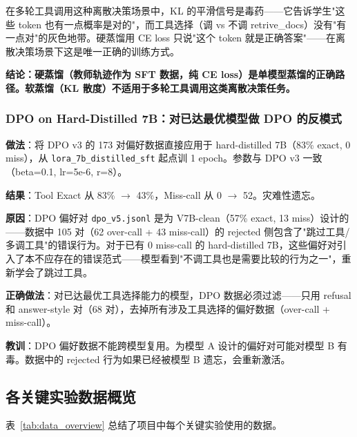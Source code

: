 \documentclass[12pt,a4paper]{ctexart}
\begin{document}
在多轮工具调用这种离散决策场景中，KL 的平滑信号是毒药——它告诉学生"这些 token 也有一点概率是对的"，而工具选择（调 vs 不调 retrive\_docs）没有"有一点对"的灰色地带。硬蒸馏用 CE loss 只说"这个 token 就是正确答案"——在离散决策场景下这是唯一正确的训练方式。

\textbf{结论：硬蒸馏（教师轨迹作为 SFT 数据，纯 CE loss）是单模型蒸馏的正确路径。软蒸馏（KL 散度）不适用于多轮工具调用这类离散决策任务。}

\subsubsection{DPO on Hard-Distilled 7B：对已达最优模型做 DPO 的反模式}

\textbf{做法}：将 DPO v3 的 173 对偏好数据直接应用于 hard-distilled 7B（83\% exact, 0 miss），从 \texttt{lora\_7b\_distilled\_sft} 起点训 1 epoch。参数与 DPO v3 一致（beta=0.1, lr=5e-6, r=8）。

\textbf{结果}：Tool Exact 从 83\% $\rightarrow$ 43\%，Miss-call 从 0 $\rightarrow$ 52。灾难性遗忘。

\textbf{原因}：DPO 偏好对 \texttt{dpo\_v5.jsonl} 是为 V7B-clean（57\% exact, 13 miss）设计的——数据中 105 对（62 over-call + 43 miss-call）的 rejected 侧包含了"跳过工具/多调工具"的错误行为。对于已有 0 miss-call 的 hard-distilled 7B，这些偏好对引入了本不应存在的错误范式——模型看到"不调工具也是需要比较的行为之一"，重新学会了跳过工具。

\textbf{正确做法}：对已达最优工具选择能力的模型，DPO 数据必须过滤——只用 refusal 和 answer-style 对（68 对），去掉所有涉及工具选择的偏好数据（over-call + miss-call）。

\textbf{教训}：DPO 偏好数据不能跨模型复用。为模型 A 设计的偏好对可能对模型 B 有毒。数据中的 rejected 行为如果已经被模型 B 遗忘，会重新激活。

\subsection{各关键实验数据概览}

表~\ref{tab:data_overview} 总结了项目中每个关键实验使用的数据。
\end{document}
